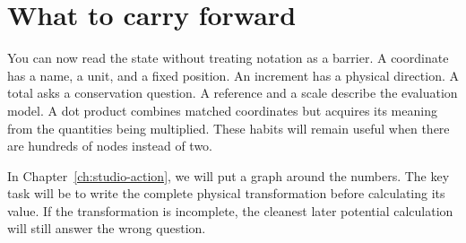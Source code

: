 \section{What to carry forward}

You can now read the state without treating notation as a barrier. A coordinate has a name, a unit, and a fixed position. An increment has a physical direction. A total asks a conservation question. A reference and a scale describe the evaluation model. A dot product combines matched coordinates but acquires its meaning from the quantities being multiplied. These habits will remain useful when there are hundreds of nodes instead of two.

In Chapter~\ref{ch:studio-action}, we will put a graph around the numbers. The key task will be to write the complete physical transformation before calculating its value. If the transformation is incomplete, the cleanest later potential calculation will still answer the wrong question.
